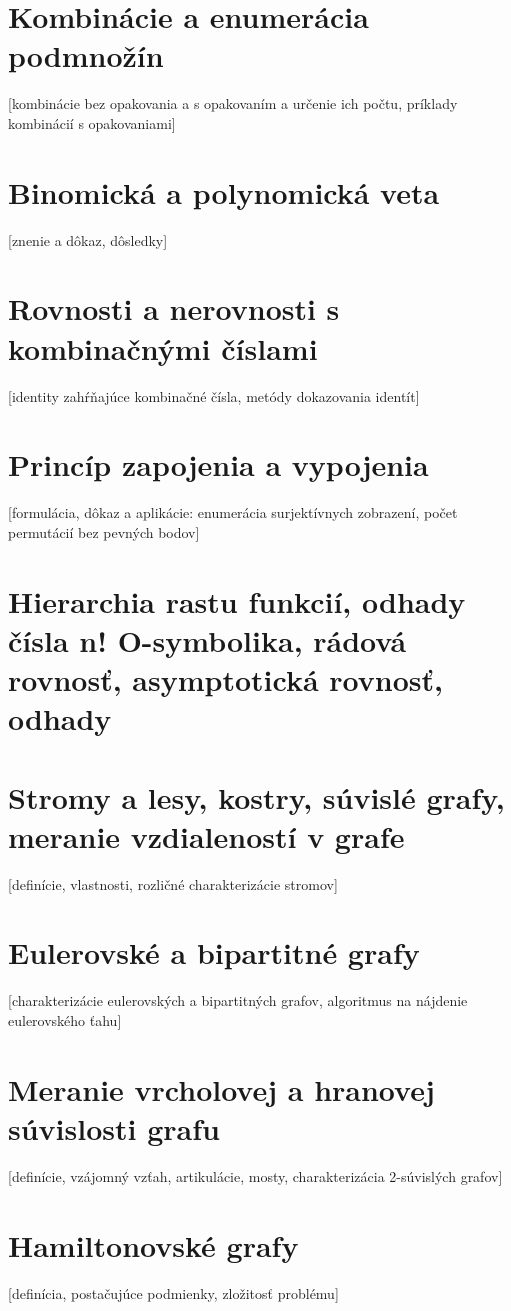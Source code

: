 \section {Kombinácie a enumerácia podmnožín}
  [kombinácie bez opakovania a s opakovaním a určenie ich počtu, príklady kombinácií s opakovaniami] 

\section {Binomická a polynomická veta}
  [znenie a dôkaz, dôsledky] 

\section {Rovnosti a nerovnosti s kombinačnými číslami}
  [identity zahŕňajúce kombinačné čísla, metódy dokazovania identít]

\section {Princíp zapojenia a vypojenia}
  [formulácia, dôkaz a aplikácie: enumerácia surjektívnych zobrazení, počet permutácií bez pevných bodov]

\section {Hierarchia rastu funkcií, odhady čísla n! O-symbolika, rádová rovnosť, asymptotická rovnosť, odhady}

\section {Stromy a lesy, kostry, súvislé grafy, meranie vzdialeností v grafe} 
  [definície, vlastnosti, rozličné charakterizácie stromov]

\section {Eulerovské a bipartitné grafy}
  [charakterizácie eulerovských a bipartitných grafov, algoritmus na nájdenie eulerovského ťahu]

\section {Meranie vrcholovej a hranovej súvislosti grafu}
  [definície, vzájomný vzťah, artikulácie, mosty, charakterizácia 2-súvislých grafov] 

\section {Hamiltonovské grafy}
  [definícia, postačujúce podmienky, zložitosť problému] 
